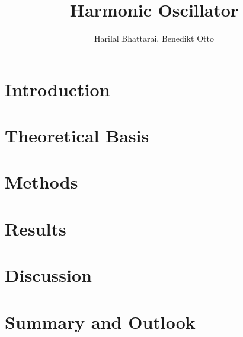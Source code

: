 \documentclass{article}
\title{Harmonic Oscillator}
\author{Harilal Bhattarai, Benedikt Otto}
\begin{document}
	\maketitle
	\newpage
	\begin{abstract}
	\end{abstract}
	\section{Introduction}
	\section{Theoretical Basis}
	\section{Methods}
	\section{Results}
	\section{Discussion}
	\section{Summary and Outlook}
\end{document}
